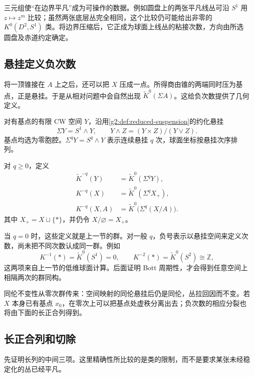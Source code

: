 三元组使“在边界平凡”成为可操作的数据。例如圆盘上的两张平凡线丛可沿 \(S^1\) 用 \(z\mapsto z^m\) 比较；虽然两张底层丛完全相同，这个比较仍可能给出非零的 \(K^0(D^2,S^1)\) 类。将边界压缩后，它正成为球面上线丛的粘接次数，方向由所选圆盘及赤道约定确定。

\subsection{悬挂定义负次数}
\label{g2:subsec:2402:02}
将一顶锥接在 \(A\) 上之后，还可以把 \(X\) 压成一点。所得商由锥的两端同时压为基点，正是悬挂。于是从相对问题中会自然出现 \(\widetilde K^0(\Sigma A)\)。这给负次数提供了几何定义。

对有基点的有限 CW 空间 \(Y\)，沿用\cref{g2:def:reduced-suspension}的约化悬挂
\[
	\Sigma Y=S^1\wedge Y,
	\qquad Y\wedge Z=(Y\times Z)/(Y\vee Z).
\]
基点均选为零胞腔。\(\Sigma^qY=S^q\wedge Y\) 表示连续悬挂 \(q\) 次，球面坐标按悬挂次序排列。

\begin{definition}\label{g2:def:negative-k-groups}
	对 \(q\ge0\)，定义
	\[
	\begin{aligned}
		\widetilde K^{-q}(Y)&=\widetilde K^0(\Sigma^qY),\\
		K^{-q}(X)&=\widetilde K^0(\Sigma^qX_+),\\
		K^{-q}(X,A)&=\widetilde K^0\bigl(\Sigma^q(X/A)\bigr).
	\end{aligned}
	\]
	其中 \(X_+=X\sqcup\{*\}\)，并仍令 \(X/\varnothing=X_+\)。
\end{definition}

当 \(q=0\) 时，这些定义就是上一节的群。对一般 \(q\)，负号表示以悬挂空间来定义次数，尚未把不同次数认成同一群。例如
\[
	K^{-1}(*)=\widetilde K^0(S^1)=0,
	\qquad K^{-2}(*)=\widetilde K^0(S^2)\cong\mathbb Z,
\]
这两项来自上一节的低维球面计算。后面证明 Bott 周期性，才会得到任意空间上相隔两次的群同构。

同伦不变性从零次群传来：空间映射的同伦悬挂后仍是同伦，丛拉回因而不变。若 \(X\) 本身已有基点 \(x_0\)，在零次上可以把基点处虚秩分离出去；负次数的相应分裂也将由下面的长正合列得到。

\subsection{长正合列和切除}
\label{g2:subsec:2402:03}
先证明长列的中间三项。这里精确性所比较的是类的限制，而不是要求某张未经稳定化的丛已经平凡。

